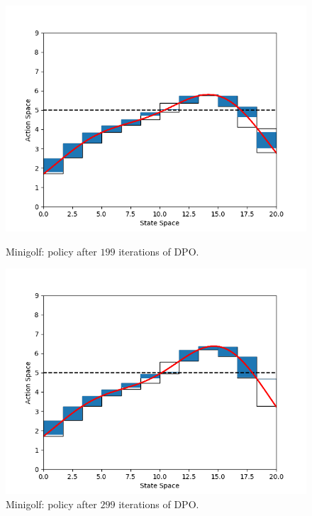 \begin{figure}[h!]
	\centering
	\begin{minipage}[t]{.48\columnwidth}
		\includegraphics[width=\textwidth]{plots/it199.png}
		\caption{Minigolf: policy after $199$ iterations of \ac{DPO}.}
		\label{fig:mg199}
	\end{minipage}%
	\hfill
	\begin{minipage}[t]{.48\columnwidth}
		\includegraphics[width=\textwidth]{plots/it299.png}
		\caption{Minigolf: policy after $299$ iterations of \ac{DPO}.}
		\label{fig:mg299}
	\end{minipage}
\end{figure}
